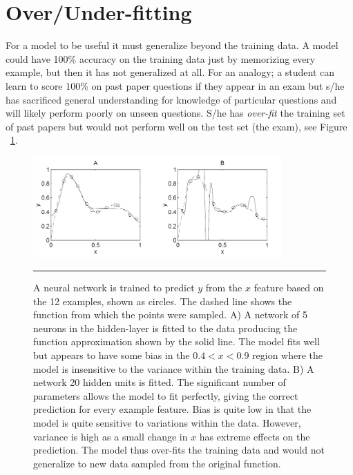   \section{Over/Under-fitting}
For a model to be useful it must generalize beyond the training data.
A model could have 100\% accuracy on the training data just by memorizing every example, but then it has not generalized at all. 
For an analogy; a student can learn to score 100\% on past paper questions if they appear in an exam but s/he has sacrificed general understanding for knowledge of particular questions and will likely perform poorly on unseen questions\citep{flach2012machine}.
S/he has \textit{over-fit} the training set of past papers but would not perform well on the test set (the exam), see Figure ~\ref{fig:Overfitting_2}.
\begin{figure}[htbp]
	\centering
		\includegraphics[width = 0.85\textwidth]{./Figures/An_intro_to_NNs_overfitting.jpg}
		\rule{35em}{0.5pt}
	\caption[Over-fitting]{A neural network is trained to predict $y$ from the $x$ feature based on the 12 examples, shown as circles. The dashed line shows the function from which the points were sampled. A) A network of 5 neurons in the hidden-layer is fitted to the data producing the function approximation shown by the solid line. The model fits well but appears to have some bias in the $0.4 < x < 0.9$ region where the model is insensitive to the variance within the training data. B) A network 20 hidden units is fitted. The significant number of parameters allows the model to fit perfectly, giving the correct prediction for every example feature. Bias is quite low in that the model is quite sensitive to variations within the data. However, variance is high as a small change in $x$ has extreme effects on the prediction. The model thus over-fits the training data and would not generalize to new data sampled from the original function.}
	\label{fig:Overfitting_2}
\end{figure}

